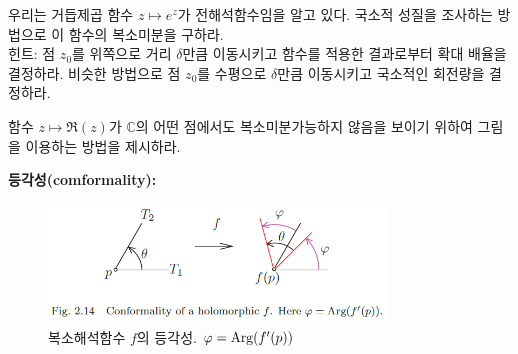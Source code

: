 \begin{salt_exercise}\label{ex-2-17}
우리는 거듭제곱 함수 $z\mapsto e^z$가 전해석함수임을 알고 있다.
국소적 성질을 조사하는 방법으로 이 함수의 복소미분을 구하라. \\[1ex]
힌트:  점 $z_0$를 위쪽으로 거리 $\delta$만큼 이동시키고
함수를 적용한 결과로부터 확대 배율을 결정하라.
비슷한 방법으로 
점 $z_0$를 수평으로 $\delta$만큼 이동시키고
국소적인 회전량을 결정하라.
\end{salt_exercise}

\begin{salt_exercise}\label{ex-2-18}
함수 $z\mapsto \Re(z)$가 
$\mathbb C$의 어떤 점에서도 복소미분가능하지 않음을 보이기 위하여
그림을 이용하는 방법을 제시하라.
\end{salt_exercise}

{\bf 등각성(comformality):}


\begin{figure}[!h]
\begin{center}
\includegraphics[width=0.8\textwidth]{./SaltChapter/fig-2-14}
\end{center}
\caption{복소해석함수 $f$의 등각성.  $\varphi = \mathop{\mathrm{Arg}}(f'(p))$}
\label{fig-2-14}
\end{figure}














